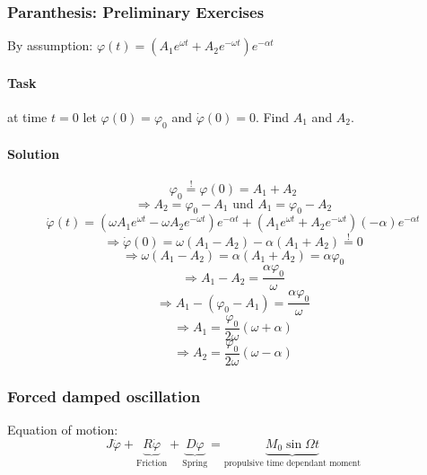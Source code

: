\documentclass{scrreprt}
\renewcommand{\phi}{\varphi}
\begin{document}
\subsubsection{Paranthesis: Preliminary Exercises}
By assumption: $\varphi(t) = (A_1e^{\omega t} + A_2e^{-\omega t})e^{-\alpha t}$\\
\paragraph*{Task} at time $t=0$ let $\varphi(0) = \varphi_0$ and $\dot{\varphi}(0) = 0$. Find $A_1$ and $A_2$.\\
\paragraph*{Solution}
\begin{equation}
\varphi_0 \stackrel{!}= \varphi(0) = A_1 + A_2
\end{equation}
\begin{equation}
\Rightarrow A_2 = \varphi_0-A_1 \mbox{ und } A_1 = \varphi_0-A_2
\end{equation}
\begin{equation}
\dot{\varphi}(t) = (\omega A_1 e^{\omega t}-\omega A_2 e^{-\omega t})e^{-\alpha t} + (A_1e^{\omega t}+A_2e^{-\omega t})(-\alpha)e^{-\alpha t}
\end{equation}
\begin{equation}
\Rightarrow \dot{\varphi}(0) = \omega (A_1-A_2) - \alpha(A_1+A_2) \stackrel{!} = 0
\end{equation}
\begin{equation}
\Rightarrow \omega(A_1-A_2) = \alpha(A_1+A_2) = \alpha \varphi_0
\end{equation}
\begin{equation}
\Rightarrow A_1-A_2 = \frac{\alpha \varphi_0}{\omega}
\end{equation}
\begin{equation}
\Rightarrow A_1 -(\varphi_0-A_1) = \frac{\alpha \varphi_0}{\omega}
\end{equation}
\begin{equation}
\Rightarrow A_1=\frac{\varphi_0}{2 \omega} (\omega + \alpha)
\end{equation}
\begin{equation}
\Rightarrow A_2=\frac{\varphi_0}{2 \omega} (\omega - \alpha)
\end{equation}

\subsubsection{Forced damped oscillation}
Equation of motion:
\begin{equation}
J\ddot{\phi} + \underbrace{R \dot{\phi}}_{\text{Friction}} + \underbrace{D \phi}_{\text{Spring}}  = \underbrace{M_0 \sin{\Omega t}}_{\text{propulsive time dependant moment}}
\end{equation}
\end{document}
